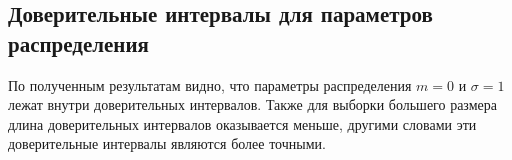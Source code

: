 \subsection{Доверительные интервалы для параметров распределения}

	По полученным результатам видно, что параметры распределения $m = 0$ и $\sigma = 1$ лежат внутри доверительных интервалов. Также для выборки большего размера длина доверительных интервалов оказывается меньше, другими словами эти доверительные интервалы являются более точными.

